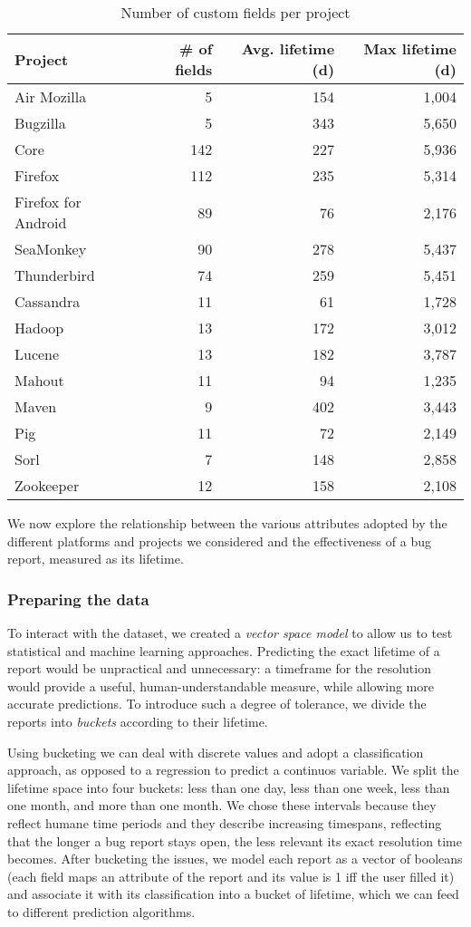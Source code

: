 \begin{table}[ht]
\centering
\caption{Number of custom fields per project}
\begin{tabular}{l|rrr}
\rowcolor{tableheader}\textbf{Project} & \textbf{\# of fields} & \textbf{Avg.
lifetime (d)} & \textbf{Max lifetime (d)} \\
 \hline
Air Mozilla & 5 & 154 & 1,004 \\
Bugzilla & 5 & 343 & 5,650 \\
Core & 142 & 227 & 5,936 \\
Firefox & 112 & 235 & 5,314 \\
Firefox for Android & 89 & 76 & 2,176 \\
SeaMonkey & 90 & 278 & 5,437 \\
Thunderbird & 74 & 259 & 5,451 \\
\hline
Cassandra & 11 & 61 & 1,728 \\
Hadoop & 13 & 172 & 3,012 \\
Lucene & 13 & 182 & 3,787 \\
Mahout & 11 & 94 & 1,235 \\
Maven & 9 & 402 & 3,443 \\
Pig & 11 & 72 & 2,149 \\
Sorl & 7 & 148 & 2,858 \\
Zookeeper & 12 & 158 & 2,108 \\
\hline
\end{tabular}
\label{tab:project-fields}
\end{table}


We now explore the relationship between the various attributes adopted by the different platforms and projects we considered and the effectiveness of a bug report, measured as its lifetime.


\subsubsection{Preparing the data} To interact with the dataset, we created a \emph{vector space model} to allow us to test statistical and machine learning approaches.
Predicting the exact lifetime of a report would be unpractical and unnecessary: a timeframe for the resolution would provide a useful, human-understandable measure, while allowing more accurate predictions.
To introduce such a degree of tolerance, we divide the reports into \emph{buckets} according to their lifetime.

 Using bucketing we can deal with discrete values and adopt a classification approach, as opposed to a regression to predict a continuos variable.
We split the lifetime space into four buckets: less than one day, less than one week, less than one month, and more than one month.
We chose these intervals because they reflect humane time periods and they describe increasing timespans, reflecting that the longer a bug report stays open, the less relevant its exact resolution time becomes.
After bucketing the issues, we model each report as a vector of booleans (each field maps an attribute of the report and its value is 1 iff the user filled it) and associate it with its classification into a bucket of lifetime, which we can feed to different prediction algorithms.


